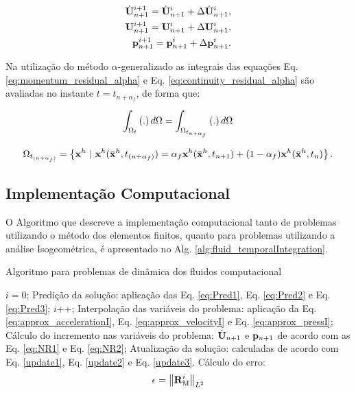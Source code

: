 \documentclass[tese_patricia]{subfiles}%
\begin{document}
\begin{align}
\dot{\mathbf{U}}_{n+1}^{i+1} = \dot{\mathbf{U}}_{n+1}^{i} + \Delta\dot{\mathbf{U}}_{n+1}^{i},\label{update1} \\ 
\mathbf{U}_{n+1}^{i+1} = \mathbf{U}_{n+1}^{i} + \Delta\mathbf{U}_{n+1}^{i},\label{update2}\\
\mathbf{p}_{n+1}^{i+1} = \mathbf{p}_{n+1}^{i} + \Delta\mathbf{p}_{n+1}^{i}.\label{update3}
\end{align}

Na utilização do método $\alpha$-generalizado as integrais das equações Eq. \eqref{eq:momentum_residual_alpha} e Eq. \eqref{eq:continuity_residual_alpha} são avaliadas no instante $t = t_{n+\alpha_{f}}$, de forma que:

\begin{align}
\int_{\Omega_{t}} \left(.\right) d\Omega = \int_{\Omega_{t_{n+\alpha_{f}}}} \left(.\right) d\Omega
\end{align}

\begin{align}
\Omega_{t_{(n+\alpha_f)}} = \left\{\mathbf{x}^h \  |\  \mathbf{x}^h(\bar{\mathbf{x}}^h,t_{(n+\alpha_f)}) = \alpha_f \mathbf{x}^h(\bar{\mathbf{x}}^h,t_{n+1}) + (1-\alpha_f) \mathbf{x}^h(\bar{\mathbf{x}}^h,t_n)  \right\}.
\end{align}





\subsection{Implementação Computacional} \label{subsection:DFCComputationalCode}


O Algoritmo que descreve a implementação computacional tanto de problemas utilizando o método dos elementos finitos, quanto para problemas utilizando a análise Isogeométrica, é apresentado no Alg. \ref{alg:fluid_temporalIntegration}.

\begin{algorithm}
	\caption{Algoritmo para problemas de dinâmica dos fluidos computacional}
	\label{alg:fluid_temporalIntegration}
	\begin{algorithmic}[1]
		\State $i=0$;
		\State Predição da solução: aplicação das Eq. \eqref{eq:Pred1}, Eq. \eqref{eq:Pred2} e Eq. \eqref{eq:Pred3};
		\State $i$++;
		\State Interpolação das variáveis do problema: aplicação da Eq. \eqref{eq:approx_accelerationI}, Eq. \eqref {eq:approx_velocityI} e Eq. \eqref{eq:approx_pressI};
		\State Cálculo do incremento nas variáveis do problema: $\dot{\mathbf{U}}_{n+1}$ e $\mathbf{p}_{n+1}$ de acordo com as Eq. \eqref{eq:NR1} e Eq. \eqref{eq:NR2};
		\State Atualização da solução: calculadas de acordo com Eq. \eqref{update1}, Eq. \eqref{update2} e Eq. \eqref{update3}.
		\State Cálculo do erro:
		\begin{align}
		\epsilon =\left\| \mathbf{R}_\mathrm{M}^i \right\|_{L^2}
		\end{align}
		\EndWhile
		\EndFor
	\end{algorithmic}
\end{algorithm}
\end{document}
